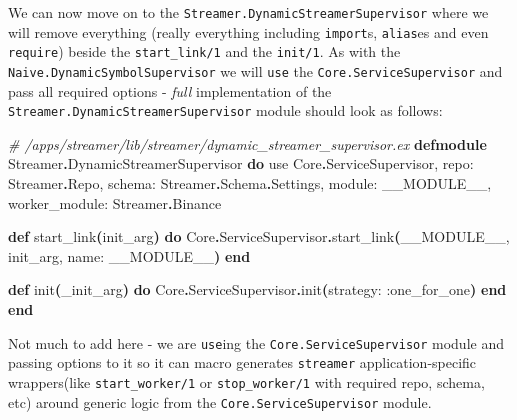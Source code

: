 \documentclass[
  oneside]{book}
\newenvironment{Shaded}{\begin{snugshade}}{\end{snugshade}}
\newcommand{\CommentTok}[1]{\textcolor[rgb]{0.56,0.35,0.01}{\textit{#1}}}
\newcommand{\ConstantTok}[1]{\textcolor[rgb]{0.56,0.35,0.01}{#1}}
\newcommand{\FunctionTok}[1]{\textcolor[rgb]{0.13,0.29,0.53}{\textbf{#1}}}
\newcommand{\ImportTok}[1]{#1}
\newcommand{\KeywordTok}[1]{\textcolor[rgb]{0.13,0.29,0.53}{\textbf{#1}}}
\newcommand{\NormalTok}[1]{#1}
\newcommand{\OperatorTok}[1]{\textcolor[rgb]{0.81,0.36,0.00}{\textbf{#1}}}
\newcommand{\VariableTok}[1]{\textcolor[rgb]{0.00,0.00,0.00}{#1}}
\begin{document}
\newpage

We can now move on to the \texttt{Streamer.DynamicStreamerSupervisor} where we will remove everything (really everything including \texttt{import}s, \texttt{alias}es and even \texttt{require}) beside the \texttt{start\_link/1} and the \texttt{init/1}. As with the \texttt{Naive.DynamicSymbolSupervisor} we will \texttt{use} the \texttt{Core.ServiceSupervisor} and pass all required options - \emph{full} implementation of the \texttt{Streamer.DynamicStreamerSupervisor} module should look as follows:

\begin{Shaded}
\begin{Highlighting}[]
\CommentTok{\# /apps/streamer/lib/streamer/dynamic\_streamer\_supervisor.ex}
\KeywordTok{defmodule} \ConstantTok{Streamer}\OperatorTok{.}\ConstantTok{DynamicStreamerSupervisor} \KeywordTok{do}
  \ImportTok{use} \ConstantTok{Core}\OperatorTok{.}\ConstantTok{ServiceSupervisor}\NormalTok{,}
    \VariableTok{repo:} \ConstantTok{Streamer}\OperatorTok{.}\ConstantTok{Repo}\NormalTok{,}
    \VariableTok{schema:} \ConstantTok{Streamer}\OperatorTok{.}\ConstantTok{Schema}\OperatorTok{.}\ConstantTok{Settings}\NormalTok{,}
    \VariableTok{module:} \ConstantTok{\_\_MODULE\_\_}\NormalTok{,}
    \VariableTok{worker\_module:} \ConstantTok{Streamer}\OperatorTok{.}\ConstantTok{Binance}

  \KeywordTok{def}\NormalTok{ start\_link}\FunctionTok{(}\NormalTok{init\_arg}\FunctionTok{)} \KeywordTok{do}
    \ConstantTok{Core}\OperatorTok{.}\ConstantTok{ServiceSupervisor}\OperatorTok{.}\NormalTok{start\_link}\FunctionTok{(}\ConstantTok{\_\_MODULE\_\_}\NormalTok{, init\_arg, }\VariableTok{name:} \ConstantTok{\_\_MODULE\_\_}\FunctionTok{)}
  \KeywordTok{end}

  \KeywordTok{def}\NormalTok{ init}\FunctionTok{(}\NormalTok{\_init\_arg}\FunctionTok{)} \KeywordTok{do}
    \ConstantTok{Core}\OperatorTok{.}\ConstantTok{ServiceSupervisor}\OperatorTok{.}\NormalTok{init}\FunctionTok{(}\VariableTok{strategy:} \VariableTok{:one\_for\_one}\FunctionTok{)}
  \KeywordTok{end}
\KeywordTok{end}
\end{Highlighting}
\end{Shaded}

Not much to add here - we are \texttt{use}ing the \texttt{Core.ServiceSupervisor} module and passing options to it so it can macro generates \texttt{streamer} application-specific wrappers(like \texttt{start\_worker/1} or \texttt{stop\_worker/1} with required repo, schema, etc) around generic logic from the \texttt{Core.ServiceSupervisor} module.
\end{document}
